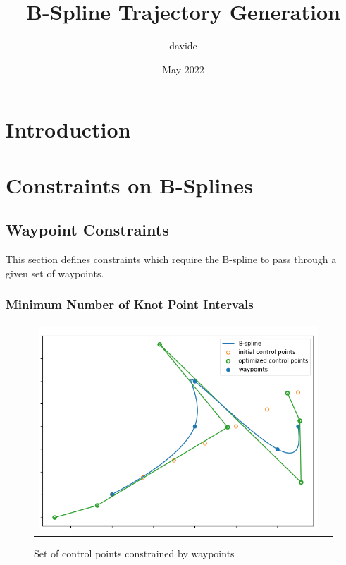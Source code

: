 \documentclass{article}
\title{B-Spline Trajectory Generation}
\author{davidc}
\date{May 2022}
\begin{document}
\maketitle

\section{Introduction}


\section{Constraints on B-Splines}

\subsection{Waypoint Constraints}

This section defines constraints which require the B-spline to pass through a given set of waypoints.

\subsubsection{Minimum Number of Knot Point Intervals} \label{Minimum Number of Knot Point Intervals}

\begin{figure}[h]
\begin{tabular}{ll}
\includegraphics[scale=.5]{WaypointConstraints.png}
\end{tabular}
\caption{Set of control points constrained by waypoints}
\label{Fig:WaypointConstraints.png}
\end{figure}
\end{document}
